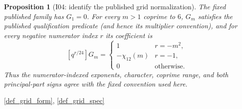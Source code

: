 \documentclass[11pt,a4paper]{article}
\numberwithin{equation}{section}
\theoremstyle{plain}\newtheorem{theorem}{Theorem}[section]\newaliascnt{proposition}{theorem}\newtheorem{proposition}[proposition]{Proposition}\aliascntresetthe{proposition}\newaliascnt{lemma}{theorem}\newtheorem{lemma}[lemma]{Lemma}\aliascntresetthe{lemma}
\theoremstyle{definition}\newaliascnt{definition}{theorem}\newtheorem{definition}[definition]{Definition}\aliascntresetthe{definition}\newaliascnt{notation}{theorem}\newtheorem{notation}[notation]{Notation}\aliascntresetthe{notation}
\providecommand{\lean}[1]{}\providecommand{\leanok}{}
\begin{document}
\begin{proposition}[I04: identify the published grid normalization]\label{prop_i04_grid_identification}\lean{SptCM.Analytic.Repaired.published_grid_normalization_agreement}\leanok
The fixed published family has $G_1=0$.  For every $m>1$ coprime to $6$,
$G_m$ satisfies the published qualification predicate (and hence its
multiplier convention), and for every negative numerator index $r$ its
coefficient is
\[
 [q^{r/24}]G_m=
 \begin{cases}
 1&r=-m^2,\\
 -\chi_{12}(m)&r=-1,\\
 0&\text{otherwise}.
 \end{cases}
\]
Thus the numerator-indexed exponents, character, coprime range, and both
principal-part signs agree with the fixed convention used here.
\end{proposition}
\begin{uses-statement}\ref{def_grid_form}, \ref{def_grid_spec}\end{uses-statement}
\end{document}
